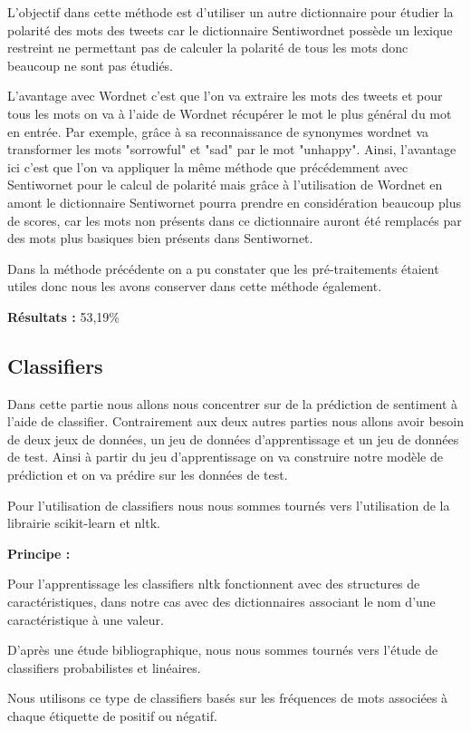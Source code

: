 \par L'objectif dans cette méthode est d'utiliser un autre dictionnaire pour étudier la polarité des mots des tweets car le dictionnaire Sentiwordnet possède un lexique restreint ne permettant pas de calculer la polarité de tous les mots donc beaucoup ne sont pas étudiés. \\

\par L'avantage avec Wordnet c'est que l'on va extraire les mots des tweets et pour tous les mots on va à l'aide de Wordnet récupérer le mot le plus général du mot en entrée. Par exemple, grâce à sa reconnaissance de synonymes wordnet va transformer les mots "sorrowful" et "sad" par le mot "unhappy". Ainsi, l'avantage ici c'est que l'on va appliquer la même méthode que précédemment avec Sentiwornet pour le calcul de polarité mais grâce à l'utilisation de Wordnet en amont le dictionnaire Sentiwornet pourra prendre en considération beaucoup plus de scores, car les mots non présents dans ce dictionnaire auront été remplacés par des mots plus basiques bien présents dans Sentiwornet. \\ 

\par Dans la méthode précédente on a pu constater que les pré-traitements étaient utiles donc nous les avons conserver dans cette méthode également. \\

\par\textbf{ Résultats : } 53,19\%

\subsection{Classifiers}

\par Dans cette partie nous allons nous concentrer sur de la prédiction de sentiment à l'aide de classifier. Contrairement aux deux autres parties nous allons avoir besoin de deux jeux de données, un jeu de données d'apprentissage et un jeu de données de test. Ainsi à partir du jeu d'apprentissage on va construire notre modèle de prédiction et on va prédire sur les données de test. \\

\par Pour l'utilisation de classifiers nous nous sommes tournés vers l'utilisation de la librairie scikit-learn et nltk. \\

\par \textbf{Principe : } \\
\par Pour l'apprentissage les classifiers nltk fonctionnent avec des structures de caractéristiques, dans notre cas avec des dictionnaires associant le nom d'une caractéristique à une valeur. 
\par D'après une étude bibliographique, nous nous sommes tournés vers l'étude de classifiers probabilistes et linéaires.
\par Nous utilisons ce type de classifiers basés sur les fréquences de mots associées à chaque étiquette de positif ou négatif. \\

